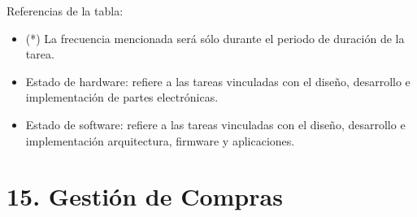 \documentclass[11pt]{charter}
\begin{document}
{\footnotesize
Referencias de la tabla:
\begin{itemize}
	\item (*) La frecuencia mencionada será sólo durante el periodo de duración de la tarea.
	\item Estado de hardware: refiere a las tareas vinculadas con el diseño, desarrollo e implementación de partes electrónicas.
	\item Estado de software: refiere a las tareas vinculadas con el diseño, desarrollo e implementación arquitectura, firmware y aplicaciones.
\end{itemize}
} %

\pagebreak
\section{15. Gestión de Compras}
\label{sec:compras}
\end{document}
